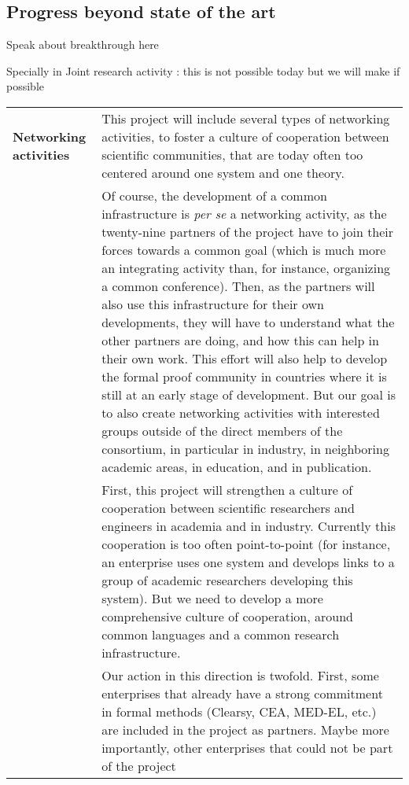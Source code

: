 \subsection*{Progress beyond state of the art}

{\color{red} Speak about breakthrough here

Specially in Joint research activity : this is not possible today
but we will make if possible}


\begin{longtable}{|p{}|p{}|}
\hline
{\bf Networking activities}
&
This project will include several types of networking activities, to
foster a culture of cooperation between scientific communities, that
are today often too centered around one system and one theory.\\
&
\hspace{0.4cm} Of course, the development of a common infrastructure is
\emph{per se} a networking activity, as the twenty-nine partners of the
project have to join their forces towards a common goal (which is much
more an integrating activity than, for instance, organizing a common
conference). Then, as the partners will also use this infrastructure
for their own developments, they will have to understand what the
other partners are doing, and how this can help in their own work.
This effort will also help to develop the formal proof community in
countries where it is still at an early stage of development.
But our goal is to also create networking activities with interested
groups outside of the direct members of the consortium, in particular
in industry, in neighboring academic areas, in education, and in
publication.\\
&
\hspace{0.4cm}
First, this project will strengthen a culture of cooperation between scientific
researchers and engineers in academia and in industry. Currently this
cooperation is too often point-to-point (for instance, an enterprise uses
one system and develops links to a group of academic researchers
developing this system). But we need to develop a more comprehensive
culture of cooperation, around common languages and a common research
infrastructure.\\
&
\hspace{0.4cm}
Our action in this direction is twofold. First, some enterprises that
already have a strong commitment in formal methods (Clearsy, CEA,
MED-EL, etc.) are included in the project as partners. Maybe more
importantly, other enterprises that could not be part of the project

\end{longtable}
